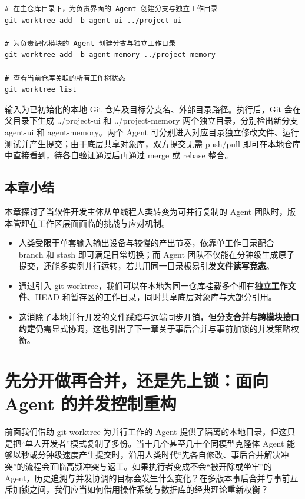 \documentclass[UTF8,a4paper,11pt,fontset=fandol]{ctexart}
\begin{document}
\begin{lstlisting}[basicstyle={\ttfamily\small\linespread{1}\selectfont},captionpos=t,caption={为并行工作的多 Agent 创建本地独立工作树}]
# 在主仓库目录下，为负责界面的 Agent 创建分支与独立工作目录
git worktree add -b agent-ui ../project-ui

# 为负责记忆模块的 Agent 创建分支与独立工作目录
git worktree add -b agent-memory ../project-memory

# 查看当前仓库关联的所有工作树状态
git worktree list
\end{lstlisting}

输入为已初始化的本地 Git 仓库及目标分支名、外部目录路径。执行后，Git 会在父目录下生成 ../project-ui 和 ../project-memory 两个独立目录，分别检出新分支 agent-ui 和 agent-memory。两个 Agent 可分别进入对应目录独立修改文件、运行测试并产生提交；由于底层共享对象库，双方提交无需 push/pull 即可在本地仓库中直接看到，待各自验证通过后再通过 merge 或 rebase 整合。

\subsection{本章小结}

本章探讨了当软件开发主体从单线程人类转变为可并行复制的 Agent 团队时，版本管理在工作区层面面临的挑战与应对机制。

\begin{itemize}
\item 人类受限于单套输入输出设备与较慢的产出节奏，依靠单工作目录配合 branch 和 stash 即可满足日常切换；而 Agent 团队不仅能在分钟级生成原子提交，还能多实例并行运转，若共用同一目录极易引发\textbf{文件读写竞态}。

\item 通过引入 git worktree，我们可以在本地为同一仓库挂载多个拥有\textbf{独立工作文件}、HEAD 和暂存区的工作目录，同时共享底层对象库与大部分引用。

\item 这消除了本地并行开发的文件踩踏与远端同步开销，但\textbf{分支合并与跨模块接口约定}仍需显式协调，这也引出了下一章关于事后合并与事前加锁的并发策略权衡。
\end{itemize}

\section{先分开做再合并，还是先上锁：面向 Agent 的并发控制重构}

前面我们借助 git worktree 为并行工作的 Agent 提供了隔离的本地目录，但这只是把“单人开发者”模式复制了多份。当十几个甚至几十个同模型克隆体 Agent 能够以秒或分钟级速度产生提交时，沿用人类时代“先各自修改、事后合并解决冲突”的流程会面临高频冲突与返工。如果执行者变成不会“被开除或坐牢”的 Agent，历史追溯与并发协调的目标会发生什么变化？在多版本事后合并与事前互斥加锁之间，我们应当如何借用操作系统与数据库的经典理论重新权衡？
\end{document}
